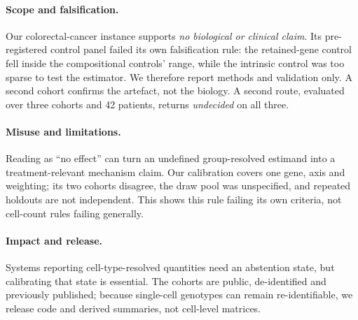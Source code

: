 
\paragraph{Scope and falsification.} Our colorectal-cancer instance supports
\emph{no biological or clinical claim}. Its pre-registered control panel failed
its own falsification rule: the retained-gene control fell inside the
compositional controls' range, while the intrinsic control was too sparse to
test the estimator. We therefore report methods and validation only. A second
cohort confirms the artefact, not the biology. A second route, evaluated
over three cohorts and 42 patients, returns \emph{undecided} on all three.

\paragraph{Misuse and limitations.} Reading \notest{} as ``no effect'' can turn
an undefined group-resolved estimand into a treatment-relevant mechanism claim.
Our calibration covers one gene, axis and weighting; its two cohorts disagree,
the draw pool was unspecified, and repeated holdouts are not independent. This
shows this rule failing its own criteria, not cell-count rules failing generally.

\paragraph{Impact and release.} Systems reporting cell-type-resolved quantities
need an abstention state, but calibrating that state is essential. The cohorts
are public, de-identified and previously published; because single-cell
genotypes can remain re-identifiable, we release code and derived summaries,
not cell-level matrices.
